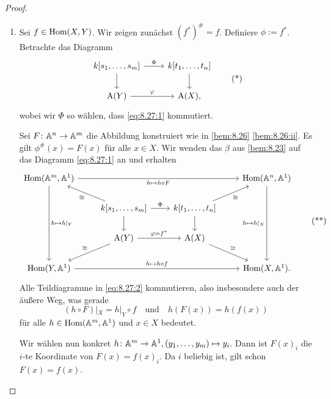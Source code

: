 \documentclass[12pt,a4paper]{scrartcl}
\theoremstyle{cplain}
\theoremstyle{cdef}
\begin{document}
\begin{proof}
	\leavevmode
	\begin{enumerate}[label=\ref{prop:8.27:\roman*}]
		\item Sei $f\in\operatorname{Hom}(X,Y)$. Wir zeigen zunächst $(f^*)^{\#} = f$. Definiere $\phi := f^*$. Betrachte das Diagramm
		\begin{equation}
			\begin{tikzcd}
				k[s_1,\dots, s_m]\arrow{r}{\Phi}\arrow{d}& k[t_1,\dots, t_n]\arrow{d}\\
				\A(Y)\arrow{r}{\phi}& \A(X),
			\end{tikzcd} \tag{*}\label{eq:8.27:1}
		\end{equation}
		wobei wir $\Phi$ so wählen, dass \eqref{eq:8.27:1} kommutiert.
		
		Sei $F\colon \mathbb A^n\to \mathbb A^m$ die Abbildung konstruiert wie in \cref{bem:8.26} \ref{bem:8.26:ii}. Es gilt $\phi^{\#}(x) = F(x)$ für alle $x\in X$. Wir wenden das $\beta$ aus \cref{bem:8.23} auf das Diagramm \eqref{eq:8.27:1} an und erhalten
		\begin{equation}
			\begin{tikzcd}[column sep=0.8cm]
				\Hom(\IA^m,\IA^1) \arrow{ddd}{h \mapsto h|_Y} \arrow{rrr}[swap]{h \mapsto h \circ F} && &\Hom(\IA^n,\IA^1) \arrow{ddd}[swap]{h \mapsto h|_X} \\
				&k[s_1,\dots, s_m] \arrow{lu}{\cong} \arrow{r}{\Phi}\arrow{d} &k[t_1,\dots, t_n]\arrow{ru}[swap]{\cong}\arrow{d}\\
				&\A(Y)\arrow{r}{\phi=f^*}\arrow{ld}[swap]{\cong} & \A(X)\arrow{rd}{\cong} \\
				\Hom(Y,\IA^1) \arrow{rrr}{h\mapsto h \circ f} && &\Hom(X,\IA^1).
			\end{tikzcd} \tag{**}\label{eq:8.27:2}
		\end{equation}
		Alle Teildiagramme in \eqref{eq:8.27:2} kommutieren, also insbesondere auch der äußere Weg, was gerade \[ (h \circ F)|_X = h|_Y \circ f \quad\text{und}\quad h(F(x))  = h(f(x)) \] für alle $h \in \operatorname{Hom}(\mathbb A^m ,\mathbb A^1)$ und $x \in X$ bedeutet.
		
		Wir wählen nun konkret $h\colon \mathbb A^m\to \mathbb A^1, (y_1,\dots, y_m)\mapsto y_i$. Dann ist $F(x)_i$ die $i$-te Koordinate von $F(x) = f(x)_i$. Da $i$ beliebig ist, gilt schon $F(x) = f(x)$.
		

\end{enumerate}
\end{proof}
\end{document}
